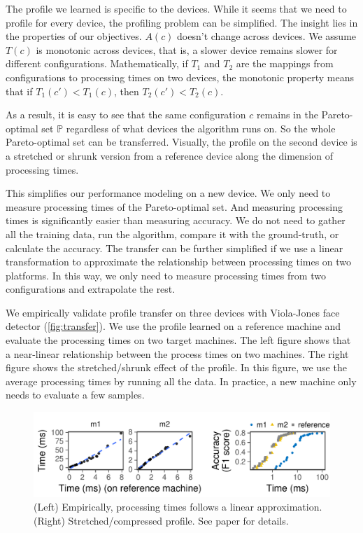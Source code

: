 The profile we learned is specific to the devices. While it seems that we need
to profile for every device, the profiling problem can be simplified. The
insight lies in the properties of our objectives. $A(c)$ doesn't change across
devices. We assume $T(c)$ is monotonic across devices, that is, a slower device
remains slower for different configurations. Mathematically, if $T_1$ and $T_2$
are the mappings from configurations to processing times on two devices, the
monotonic property means that if $T_1(c') < T_1(c)$, then $T_2(c') < T_2(c)$.

As a result, it is easy to see that the same configuration $c$ remains in the
Pareto-optimal set $\mathbb{P}$ regardless of what devices the algorithm runs
on. So the whole Pareto-optimal set can be transferred. Visually, the profile on
the second device is a stretched or shrunk version from a reference device along
the dimension of processing times.

This simplifies our performance modeling on a new device. We only need to
measure processing times of the Pareto-optimal set. And measuring processing
times is significantly easier than measuring accuracy. We do not need to gather
all the training data, run the algorithm, compare it with the ground-truth, or
calculate the accuracy. The transfer can be further simplified if we use a
linear transformation to approximate the relationship between processing times
on two platforms. In this way, we only need to measure processing times from two
configurations and extrapolate the rest.

We empirically validate profile transfer on three devices with Viola-Jones face
detector (\autoref{fig:transfer}). We use the profile learned on a reference
machine and evaluate the processing times on two target machines. The left
figure shows that a near-linear relationship between the process times on two
machines. The right figure shows the stretched/shrunk effect of the profile. In
this figure, we use the average processing times by running all the data. In
practice, a new machine only needs to evaluate a few samples.

\begin{figure}
  \centering
  \includegraphics[width=0.9\linewidth]{figures/serving-cross-platform.pdf}
  \caption{(Left) Empirically, processing times follows a linear
    approximation. (Right) Stretched/compressed profile. See paper for
    details.}
  \label{fig:transfer}
\end{figure}

